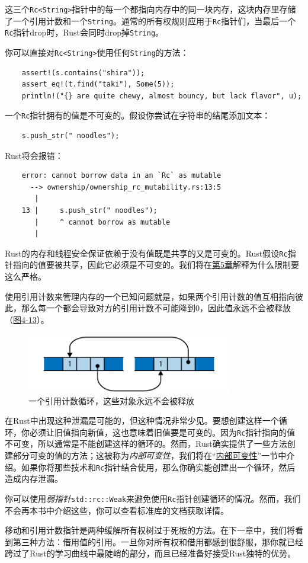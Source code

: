 这三个\texttt{Rc<String>}指针中的每一个都指向内存中的同一块内存，这块内存里存储了一个引用计数和一个\texttt{String}。通常的所有权规则应用于\texttt{Rc}指针们，当最后一个\texttt{Rc}指针drop时，Rust会同时drop掉\texttt{String}。

你可以直接对\texttt{Rc<String>}使用任何\texttt{String}的方法：
\begin{verbatim}
    assert!(s.contains("shira"));
    assert_eq!(t.find("taki"), Some(5));
    println!("{} are quite chewy, almost bouncy, but lack flavor", u);
\end{verbatim}

一个\texttt{Rc}指针拥有的值是不可变的。假设你尝试在字符串的结尾添加文本：
\begin{verbatim}
    s.push_str(" noodles");
\end{verbatim}

Rust将会报错：
\begin{verbatim}
    error: cannot borrow data in an `Rc` as mutable
      --> ownership/ownership_rc_mutability.rs:13:5
       |
    13 |     s.push_str(" noodles");
       |     ^ cannot borrow as mutable
       |
\end{verbatim}

Rust的内存和线程安全保证依赖于没有值既是共享的又是可变的。Rust假设\texttt{Rc}指针指向的值要被共享，因此它必须是不可变的。我们将在\hyperref[ch05]{第5章}解释为什么限制要这么严格。

 使用引用计数来管理内存的一个已知问题就是，如果两个引用计数的值互相指向彼此，那么每一个都会导致对方的引用计数不可能降到0，因此值永远不会被释放（\hyperref[f4-13]{图4-13}）。

 \begin{figure}[htbp]
    \centering
    \includegraphics[width=0.8\textwidth]{../img/f4-13.png}
    \caption{一个引用计数循环，这些对象永远不会被释放}
    \label{f4-13}
 \end{figure}

在Rust中出现这种泄漏是可能的，但这种情况非常少见。要想创建这样一个循环，你必须让旧值指向新值，这也意味着旧值要是可变的。因为\texttt{Rc}指针指向的值不可变，所以通常是不能创建这样的循环的。然而，Rust确实提供了一些方法创建部分可变的值的方法；这被称为\emph{内部可变性}，我们将在“\hyperref[intermut]{内部可变性}”一节中介绍。如果你将那些技术和\texttt{Rc}指针结合使用，那么你确实能创建出一个循环，然后造成内存泄漏。

你可以使用\emph{弱指针}\texttt{std::rc::Weak}来避免使用\texttt{Rc}指针创建循环的情况。然而，我们不会再本书中介绍这些，你可以查看标准库的文档获取详情。

移动和引用计数指针是两种缓解所有权树过于死板的方法。在下一章中，我们将看到第三种方法：借用值的引用。一旦你对所有权和借用都感到很舒服，那你就已经跨过了Rust的学习曲线中最陡峭的部分，而且已经准备好接受Rust独特的优势。
